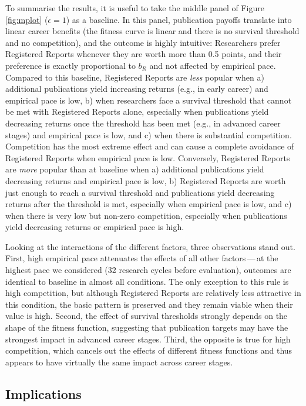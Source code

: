 \documentclass[
  british,
  a4paper,
  ,man,mask,floatsintext]{apa6}
\begin{document}
To summarise the results, it is useful to take
the middle panel of Figure \ref{fig:mplot} (\(\epsilon = 1\)) as a baseline.
In this panel, publication payoffs translate into linear career benefits (the fitness curve is linear and there is no survival threshold and no competition), and the outcome is highly intuitive:
Researchers prefer Registered Reports whenever they are worth more than 0.5 points, and their preference is exactly proportional to \(b_{R}\) and not affected by empirical pace.
Compared to this baseline, Registered Reports are \emph{less} popular when a) additional publications yield increasing returns (e.g., in early career) and empirical pace is low, b) when researchers face a survival threshold that cannot be met with Registered Reports alone, especially when publications yield decreasing returns once the threshold has been met (e.g., in advanced career stages) and empirical pace is low, and c) when there is substantial competition.
Competition has the most extreme effect and can cause a complete avoidance of Registered Reports when empirical pace is low.
Conversely, Registered Reports are \emph{more} popular than at baseline when a) additional publications yield decreasing returns and empirical pace is low, b) Registered Reports are worth just enough to reach a survival threshold and publications yield decreasing returns after the threshold is met, especially when empirical pace is low, and c) when there is very low but non-zero competition, especially when publications yield decreasing returns or empirical pace is high.

Looking at the interactions of the different factors, three observations stand out.
First, high empirical pace attenuates the effects of all other factors\(\,\)---\(\,\)at the highest pace we considered (32 research cycles before evaluation), outcomes are identical to baseline in almost all conditions.
The only exception to this rule is high competition, but although Registered Reports are relatively less attractive in this condition, the basic pattern is preserved and they remain viable when their value is high.
Second, the effect of survival thresholds strongly depends on the shape of the fitness function, suggesting that publication targets may have the strongest impact in advanced career stages.
Third, the opposite is true for high competition, which cancels out the effects of different fitness functions and thus appears to have virtually the same impact across career stages.

\subsection{Implications}\label{implications}
\end{document}
